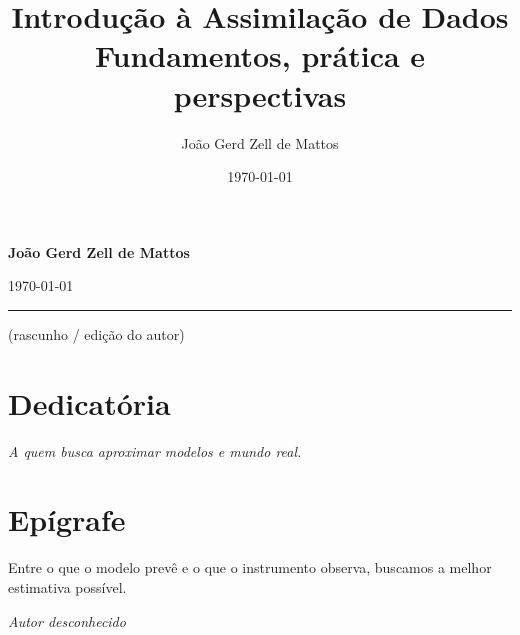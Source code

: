 \documentclass[12pt,a4paper,oneside]{book}
\title{Introdução à Assimilação de Dados\\
\large Fundamentos, prática e perspectivas}
\author{João Gerd Zell de Mattos}
\date{\today}
\begin{document}

\begin{titlepage}
  \centering
  \vspace*{1cm}
  \vfill
  {\Large\color{textgray} \textbf{João Gerd Zell de Mattos}\par}
  \vspace{0.25cm}
  {\large\color{textgray} \today\par}
  \vspace{1.5cm}
  \begin{center}
    \rule{0.35\linewidth}{0.6pt}\par
    \vspace{0.2cm}
    {\small\color{textgray} (rascunho / edição do autor)}
  \end{center}
\end{titlepage}

\frontmatter

\chapter*{Dedicatória}
\vspace*{2cm}
\begin{flushright}
\emph{A quem busca aproximar modelos e mundo real.}
\end{flushright}

\chapter*{Epígrafe}
\epigraph{Entre o que o modelo prevê e o que o instrumento observa, buscamos a melhor estimativa possível.}{\textit{Autor desconhecido}}
\end{document}
